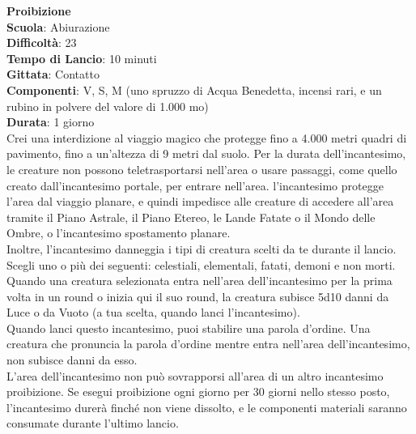 \begin{multicols}{2}
\medskip\textbf{Proibizione}\\
\textbf{Scuola}: Abiurazione\\
\textbf{Difficoltà}:  23\\
\textbf{Tempo di Lancio}: 10 minuti\\
\textbf{Gittata}: Contatto\\
\textbf{Componenti}: V, S, M (uno spruzzo di Acqua Benedetta, incensi rari, e un rubino in polvere del valore di 1.000 mo)\\
\textbf{Durata}: 1 giorno\\
Crei una interdizione al viaggio magico che protegge fino a 4.000 metri quadri di pavimento, fino a un'altezza di 9 metri dal suolo. Per la durata dell'incantesimo, le creature non possono teletrasportarsi nell'area o usare passaggi, come quello creato dall'incantesimo portale, per entrare nell'area. l'incantesimo protegge l’area dal viaggio planare, e quindi impedisce alle creature di accedere all'area tramite il Piano Astrale, il Piano Etereo, le Lande Fatate o il Mondo delle Ombre, o l'incantesimo spostamento planare.\\
Inoltre, l'incantesimo danneggia i tipi di creatura scelti da te durante il lancio. Scegli uno o più dei seguenti: celestiali, elementali, fatati, demoni e non morti. Quando una creatura selezionata entra nell'area dell'incantesimo per la prima volta in un round o inizia qui il suo round, la creatura subisce 5d10 danni da Luce o da Vuoto (a tua scelta, quando lanci l'incantesimo). \\
Quando lanci questo incantesimo, puoi stabilire una parola d’ordine. Una creatura che pronuncia la parola d’ordine mentre entra nell'area dell'incantesimo, non subisce danni da esso.\\
L’area dell'incantesimo non può sovrapporsi all'area di un altro incantesimo proibizione. Se esegui proibizione ogni giorno per 30 giorni nello stesso posto, l'incantesimo durerà finché non viene dissolto, e le componenti materiali saranno consumate durante l’ultimo lancio.


\end{multicols}
